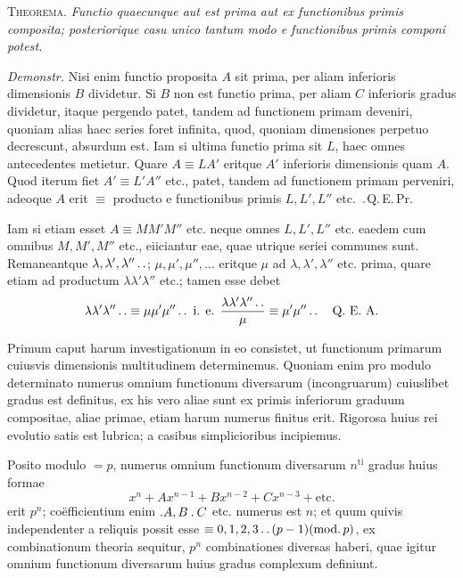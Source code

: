 \textsc{Theorema.} \emph{Functio quaecunque aut est prima aut ex functionibus primis composita; posteriorique casu unico tantum modo e functionibus primis componi potest.}

\emph{Demonstr.} Nisi enim functio proposita $A$ sit prima, per aliam inferioris dimensionis $B$ dividetur. Si $B$ non est functio prima, per aliam $C$ inferioris gradus dividetur, itaque pergendo patet, tandem ad functionem primam deveniri, quoniam alias haec series foret infinita, quod, quoniam dimensiones perpetuo decrescunt, absurdum est. Iam si ultima functio prima sit $L$, haec omnes antecedentes metietur. Quare $A\equiv LA'$ eritque $A'$ inferioris dimensionis quam $A$. Quod iterum fiet $A'\equiv L'A''$ etc., patet, tandem ad functionem primam perveniri, adeoque $A$ erit $\equiv$ producto e functionibus primis $L,L',L''$ etc.\ $\mathbin{.}$Q.\,E.\,Pr.

Iam si etiam esset $A\equiv MM'M''$ etc. neque omnes $L,L',L''$ etc. eaedem cum omnibus $M,M',M''$ etc., eiiciantur eae, quae utrique seriei communes
%
sunt. Remaneantque $\lambda,\lambda',\lambda''\mathinner{.\,.}$; $\mu,\mu',\mu'',\ldots$ eritque $\mu$ ad $\lambda,\lambda',\lambda''$ etc. prima, quare etiam ad productum $\lambda\lambda'\lambda''$ etc.; tamen esse debet
\[
\lambda\lambda'\lambda''\mathinner{.\,.}\equiv\mu\mu'\mu''\mathinner{.\,.}\text{ i. e. }\frac{\lambda\lambda'\lambda''\mathinner{.\,.}}{\mu}\equiv\mu'\mu''\mathinner{.\,.}\quad\text{Q. E. A.}
\]

Primum caput harum investigationum in eo consistet, ut functionum primarum cuiusvis dimensionis multitudinem determinemus. Quoniam enim pro modulo determinato numerus omnium functionum diversarum (incongruarum) cuiuslibet gradus est definitus, ex his vero aliae sunt ex primis inferiorum graduum compositae, aliae primae, etiam harum numerus finitus erit. Rigorosa huius rei evolutio satis est lubrica; a casibus simplicioribus incipiemus.

Posito modulo $=p$, numerus omnium functionum diversarum $n^{\mathrm{ti}}$ gradus huius formae
\[
x^n+Ax^{n-1}+Bx^{n-2}+Cx^{n-3}+\text{etc.}
\]
erit $p^n$; coëfficientium enim $\mathbin{.} A,B\mathbin{.} C$ etc. numerus est $n$; et quum quivis independenter a reliquis possit esse $\equiv0,1,2,3\mathinner{.\,.}(p-1)(\mathrm{mod.}\,p)$, ex combinationum theoria sequitur, $p^n$ combinationes diversas haberi, quae igitur omnium functionum diversarum huius gradus complexum definiunt.

